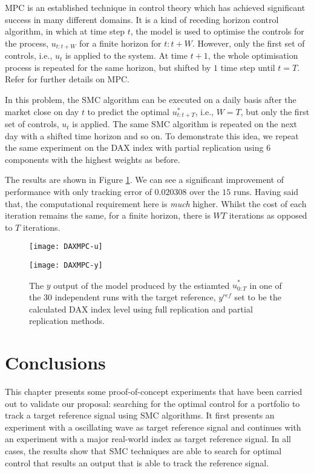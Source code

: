 MPC is an established technique in control theory which has achieved significant success in many different domains. It is a kind of receding horizon control algorithm, in which at time step $t$, the model is used to optimise the controls for the process, $u_{t:t+W}$ for a finite horizon for $t:t+W$. However, only the first set of controls, i.e., $u_{t}$ is applied to the system. At time $t+1$, the whole optimisation process is repeated for the same horizon, but shifted by $1$ time step until $t=T$. Refer \cite{GCE89} for further details on MPC. 

In this problem, the SMC algorithm can be executed on a daily basis after the market close on day $t$ to predict the optimal $u^*_{t:t+T}$, i.e., $W=T$, but only the first set of controls, $u_t$ is applied. The same SMC algorithm is repeated on the next day with a shifted time horizon and so on. To demonstrate this idea, we repeat the same experiment on the DAX index with partial replication using $6$ components with the highest weights as before.

The results are shown in Figure \ref{fig:mpc}. We can see a significant improvement of performance with only tracking error of $0.020308$ over the $15$ runs. Having said that, the computational requirement here is \emph{much} higher. Whilst the cost of each iteration remains the same, for a finite horizon, there is $WT$ iterations as opposed to $T$ iterations.
 
\begin{figure}[htbp]
\centering
    \begin{minipage}{0.5\textwidth}
        \centering
        \texttt{[image: DAXMPC-u]}
    \end{minipage}%
    \begin{minipage}{0.5\textwidth}
        \centering
        \texttt{[image: DAXMPC-y]}
    \end{minipage}
\caption{The $y$ output of the model produced by the estiamted $\hat{u}^*_{0:T}$ in one of the 30 independent runs with the target reference, $y^{ref}$ set to be the calculated DAX index level using full replication and partial replication methods.}
\label{fig:mpc}
\end{figure}

\section{Conclusions}
\label{sec:conclusion5}
This chapter presents some proof-of-concept experiments that have been
carried out to validate our proposal: searching for the optimal control for a portfolio to track a target reference signal using SMC algorithms. It first presents an experiment with a oscillating wave as target reference signal and continues with an experiment with a major real-world index as target reference signal. In all cases, the results show that SMC techniques are able to search for optimal control that results an output that is able to track the reference signal.
